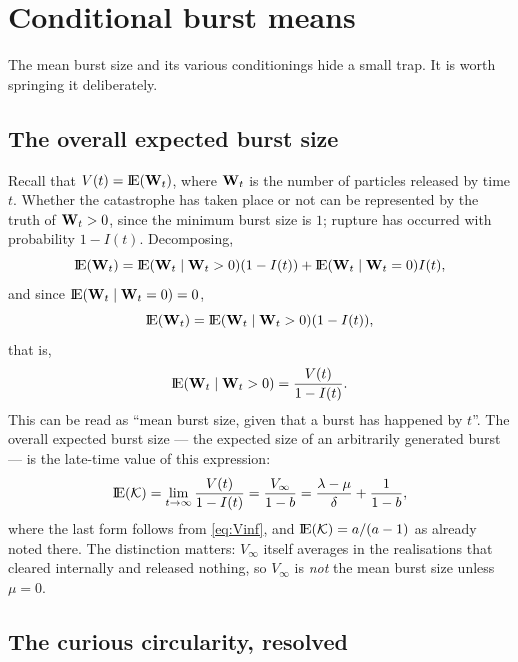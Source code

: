 \section{Conditional burst means}
\label{sec:cond-means}

The mean burst size and its various conditionings hide a small trap. It is
worth springing it deliberately.

\subsection{The overall expected burst size}

Recall that $V(t)={\rm I}\!{\rm E}({{\bf W}_t})$, where ${{\bf W}_t}$ is the number of particles
released by time $t$. Whether the catastrophe has taken place or not can be
represented by the truth of ${{\bf W}_t}>0$, since the minimum burst size is $1$;
rupture has occurred with probability $1-I(t)$. Decomposing,
$${\rm I}\!{\rm E}({{\bf W}_t}) = {\rm I}\!{\rm E}({{\bf W}_t}\mid{{\bf W}_t} > 0)(1-I(t)) + {{\rm I}\!{\rm E}({{\bf W}_t} \mid {{\bf W}_t} = 0)}I(t),$$
and since ${{\rm I}\!{\rm E}({{\bf W}_t} \mid {{\bf W}_t} = 0)} = 0$,
$${\rm I}\!{\rm E}({{\bf W}_t}) = {\rm I}\!{\rm E}({{\bf W}_t}\mid{{\bf W}_t} > 0)(1-I(t)),$$
that is,
\begin{equation}
{\rm I}\!{\rm E}({{\bf W}_t}\mid{{\bf W}_t} > 0) = \frac{V(t)}{1-I(t)}.
\label{eq:VoverI}
\end{equation}
This can be read as ``mean burst size, given that a burst has happened by
$t$''. The overall expected burst size --- the expected size of an
arbitrarily generated burst --- is the late-time value of this expression:
\begin{equation}
{\rm I}\!{\rm E}(\mathcal{K})=\lim_{t\to\infty}\frac{V(t)}{1-I(t)}
=\frac{V_\infty}{1-b}
=\frac{\lambda-\mu}{\delta}+\frac{1}{1-b},
\label{eq:meanK}
\end{equation}
where the last form follows from \eqref{eq:Vinf}, and ${\rm I}\!{\rm E}(\mathcal{K})=a/(a-1)$
as already noted there. The distinction matters:
$V_\infty$ itself averages in the realisations that cleared internally and
released nothing, so $V_\infty$ is \emph{not} the mean burst size unless
$\mu=0$.

\subsection{The curious circularity, resolved}
\label{sec:circularity}

